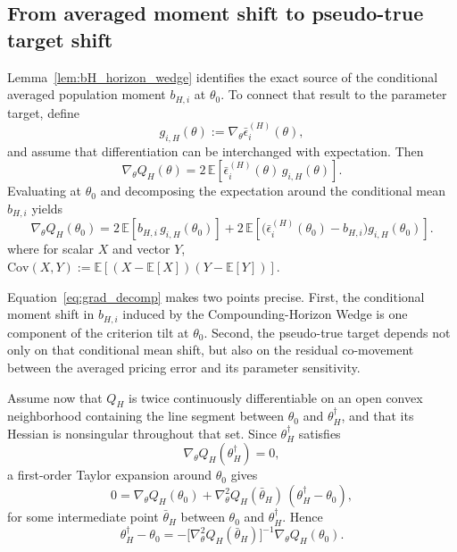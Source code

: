 \subsection{From averaged moment shift to pseudo-true target shift}
\label{sec:appendix_bv_target_shift}

Lemma~\ref{lem:bH_horizon_wedge} identifies the exact source of the conditional averaged population moment $b_{H,i}$ at $\theta_0$.
To connect that result to the parameter target, define
\[
g_{i,H}(\theta)
:=
\nabla_\theta \bar{\epsilon}_i^{(H)}(\theta),
\]
and assume that differentiation can be interchanged with expectation.
Then
\begin{equation}
	\label{eq:grad_QH}
	\nabla_\theta Q_H(\theta)
	=
	2\,
	\mathbb{E}\!\left[
	\bar{\epsilon}_i^{(H)}(\theta)\,
	g_{i,H}(\theta)
	\right].
\end{equation}
Evaluating at $\theta_0$ and decomposing the expectation around the conditional mean $b_{H,i}$ yields
\begin{equation}
	\label{eq:grad_decomp}
	\nabla_\theta Q_H(\theta_0)
	=
	2\,\mathbb{E}[b_{H,i}\,g_{i,H}(\theta_0)]
	+
	2\,\mathbb{E}\!\left[
	\bigl(\bar{\epsilon}_i^{(H)}(\theta_0)-b_{H,i}\bigr)
	g_{i,H}(\theta_0)
	\right].
\end{equation}
where for scalar $X$ and vector $Y$, $\mathrm{Cov}(X,Y):=\mathbb{E}[(X-\mathbb{E}[X])(Y-\mathbb{E}[Y])]$.

Equation~\eqref{eq:grad_decomp} makes two points precise.
First, the conditional moment shift in $b_{H,i}$ induced by the Compounding-Horizon Wedge is one component of the criterion tilt at $\theta_0$.
Second, the pseudo-true target depends not only on that conditional mean shift, but also on the residual co-movement between the averaged pricing error and its parameter sensitivity.

Assume now that $Q_H$ is twice continuously differentiable on an open convex neighborhood containing the line segment between $\theta_0$ and $\theta_H^\dagger$, and that its Hessian is nonsingular throughout that set.
Since $\theta_H^\dagger$ satisfies
\begin{equation}
	\label{eq:FOC_QH}
	\nabla_\theta Q_H(\theta_H^\dagger)=0,
\end{equation}
a first-order Taylor expansion around $\theta_0$ gives
\begin{equation}
	\label{eq:FOC_taylor}
	0
	=
	\nabla_\theta Q_H(\theta_0)
	+
	\nabla_\theta^2 Q_H(\bar{\theta}_H)\,
	(\theta_H^\dagger-\theta_0),
\end{equation}
for some intermediate point $\bar{\theta}_H$ between $\theta_0$ and $\theta_H^\dagger$.
Hence
\begin{equation}
	\label{eq:theta_shift}
	\theta_H^\dagger-\theta_0
	=
	-
	\bigl[\nabla_\theta^2 Q_H(\bar{\theta}_H)\bigr]^{-1}
	\nabla_\theta Q_H(\theta_0).
\end{equation}

